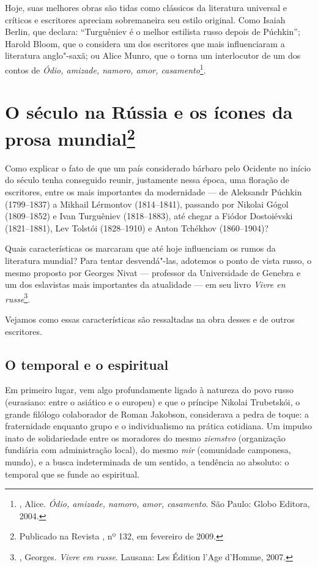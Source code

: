Hoje, suas melhores obras são tidas como clássicos da literatura
universal e críticos e escritores apreciam sobremaneira seu estilo
original. Como Isaiah Berlin, que declara: ``Turguêniev é o melhor
estilista russo depois de Púchkin''; Harold Bloom, que o considera um dos
escritores que mais influenciaram a literatura anglo"-saxã; ou Alice
Munro, que o torna um interlocutor de um dos contos de \emph{Ódio,
amizade, namoro, amor, casamento}\footnote{, Alice. \emph{Ódio,
  amizade, namoro, amor, casamento}. São Paulo: Globo Editora, 2004.}.

\chapter{O século  na Rússia e os ícones da prosa mundial\footnote{Publicado na Revista , nº 132, em fevereiro de 2009.}}

Como explicar o fato de que um país considerado bárbaro pelo Ocidente no
início do século  tenha conseguido reunir, justamente nessa época,
uma floração de escritores, entre os mais importantes da modernidade ---
de Aleksandr Púchkin (1799--1837) a Mikhail Lérmontov (1814--1841),
passando por Nikolai Gógol (1809--1852) e Ivan Turguêniev (1818--1883),
até chegar a Fiódor Dostoiévski (1821--1881), Lev Tolstói (1828--1910) e
Anton Tchékhov (1860--1904)?

Quais características os marcaram que até hoje influenciam os rumos da
literatura mundial? Para tentar desvendá"-las, adotemos o ponto de vista
russo, o mesmo proposto por Georges Nivat --- professor da Universidade
de Genebra e um dos eslavistas mais importantes da atualidade --- em seu
livro \emph{Vivre en russe}\footnote{, Georges. \emph{Vivre em
  russe}. Lausana: Les Édition l'Age d'Homme, 2007.}.

Vejamos como essas características são ressaltadas na obra desses e de
outros escritores.

\section{O temporal e o espiritual}

Em primeiro lugar, vem algo profundamente ligado à natureza do povo
russo (eurasiano: entre o asiático e o europeu) e que o príncipe Nikolai
Trubetskói, o grande filólogo colaborador de Roman Jakobson, considerava
a pedra de toque: a fraternidade enquanto grupo e o individualismo na
prática cotidiana. Um impulso inato de solidariedade entre os moradores
do mesmo \emph{ziemstvo} (organização fundiária com administração
local), do mesmo \emph{mir} (comunidade camponesa, mundo), e a busca
indeterminada de um sentido, a tendência ao absoluto: o temporal que se
funde ao espiritual.

